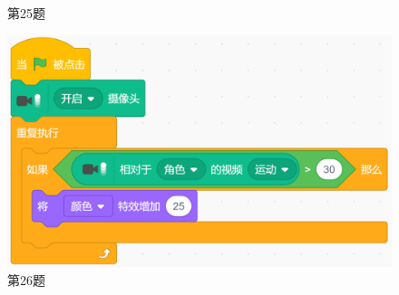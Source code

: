 \documentclass[10pt, a4paper]{article}
\begin{document}
\begin{figure}[htbp]
\begin{minipage}[t]{.11\textwidth}
            \caption*{第25题}
        \end{minipage}
        \begin{minipage}[t]{.3\textwidth}
            \centering
            \includegraphics[width=\textwidth]{26.png}
            \caption*{第26题}
        \end{minipage}
        \begin{minipage}[t]{.18\textwidth}
            \centering

\end{minipage}
\end{figure}
\end{document}
